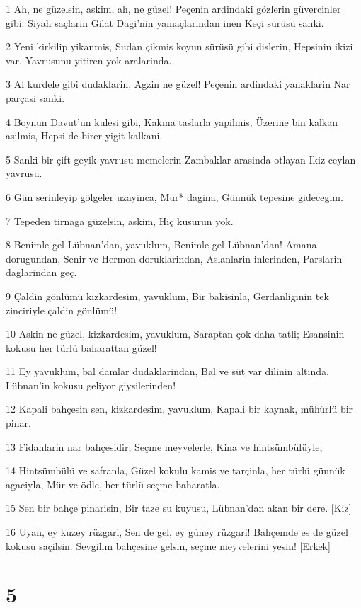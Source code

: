 \par 1 Ah, ne güzelsin, askim, ah, ne güzel! Peçenin ardindaki gözlerin güvercinler gibi. Siyah saçlarin Gilat Dagi'nin yamaçlarindan inen Keçi sürüsü sanki.
\par 2 Yeni kirkilip yikanmis, Sudan çikmis koyun sürüsü gibi dislerin, Hepsinin ikizi var. Yavrusunu yitiren yok aralarinda.
\par 3 Al kurdele gibi dudaklarin, Agzin ne güzel! Peçenin ardindaki yanaklarin Nar parçasi sanki.
\par 4 Boynun Davut'un kulesi gibi, Kakma taslarla yapilmis, Üzerine bin kalkan asilmis, Hepsi de birer yigit kalkani.
\par 5 Sanki bir çift geyik yavrusu memelerin Zambaklar arasinda otlayan Ikiz ceylan yavrusu.
\par 6 Gün serinleyip gölgeler uzayinca, Mür* dagina, Günnük tepesine gidecegim.
\par 7 Tepeden tirnaga güzelsin, askim, Hiç kusurun yok.
\par 8 Benimle gel Lübnan'dan, yavuklum, Benimle gel Lübnan'dan! Amana dorugundan, Senir ve Hermon doruklarindan, Aslanlarin inlerinden, Parslarin daglarindan geç.
\par 9 Çaldin gönlümü kizkardesim, yavuklum, Bir bakisinla, Gerdanliginin tek zinciriyle çaldin gönlümü!
\par 10 Askin ne güzel, kizkardesim, yavuklum, Saraptan çok daha tatli; Esansinin kokusu her türlü baharattan güzel!
\par 11 Ey yavuklum, bal damlar dudaklarindan, Bal ve süt var dilinin altinda, Lübnan'in kokusu geliyor giysilerinden!
\par 12 Kapali bahçesin sen, kizkardesim, yavuklum, Kapali bir kaynak, mühürlü bir pinar.
\par 13 Fidanlarin nar bahçesidir; Seçme meyvelerle, Kina ve hintsümbülüyle,
\par 14 Hintsümbülü ve safranla, Güzel kokulu kamis ve tarçinla, her türlü günnük agaciyla, Mür ve ödle, her türlü seçme baharatla.
\par 15 Sen bir bahçe pinarisin, Bir taze su kuyusu, Lübnan'dan akan bir dere. [Kiz]
\par 16 Uyan, ey kuzey rüzgari, Sen de gel, ey güney rüzgari! Bahçemde es de güzel kokusu saçilsin. Sevgilim bahçesine gelsin, seçme meyvelerini yesin! [Erkek]

\chapter{5}


